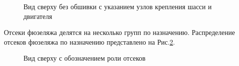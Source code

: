 \begin{figure}[H]
\centering
\def\svgwidth{0.9\textwidth}

\caption{Вид сверху без обшивки с указанием узлов крепления шасси и двигателя}
\label{fig:BPS_Catia_Top_WithoutSkin}
\end{figure}

Отсеки фюзеляжа делятся на несколько групп по назначению. Распределение отсеков фюзеляжа по назначению представлено на Рис.\ref{fig:BPS_Catia_Top_PartRoles}. 


\begin{figure}[H]
\centering
\def\svgwidth{0.9\textwidth}

\caption{Вид сверху с обозначением роли отсеков}
\label{fig:BPS_Catia_Top_PartRoles}
\end{figure}











